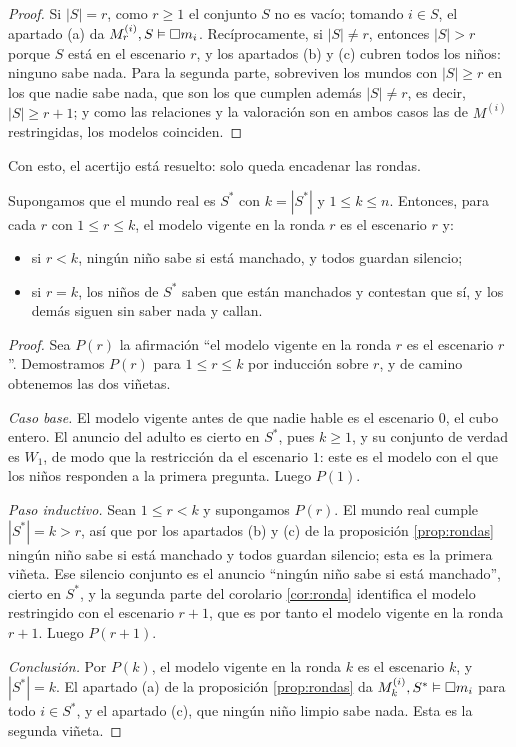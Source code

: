 \begin{proof}
Si $|S| = r$, como $r \ge 1$ el conjunto $S$ no es vacío; tomando $i \in S$, el apartado (a) da $M_r^{(i)}, S \vDash \square m_i$. Recíprocamente, si $|S| \ne r$, entonces $|S| > r$ porque $S$ está en el escenario $r$, y los apartados (b) y (c) cubren todos los niños: ninguno sabe nada. Para la segunda parte, sobreviven los mundos con $|S| \ge r$ en los que nadie sabe nada, que son los que cumplen además $|S| \ne r$, es decir, $|S| \ge r+1$; y como las relaciones y la valoración son en ambos casos las de $M^{(i)}$ restringidas, los modelos coinciden.
\end{proof}

Con esto, el acertijo está resuelto: solo queda encadenar las rondas.

\begin{teorema}\label{teo:muddy}
Supongamos que el mundo real es $S^{*}$ con $k = |S^{*}|$ y $1 \le k \le n$. Entonces, para cada $r$ con $1 \le r \le k$, el modelo vigente en la ronda $r$ es el escenario $r$ y:
\begin{itemize}
  \item si $r < k$, ningún niño sabe si está manchado, y todos guardan silencio;
  \item si $r = k$, los niños de $S^{*}$ saben que están manchados y contestan que sí, y los demás siguen sin saber nada y callan.
\end{itemize}
\end{teorema}

\begin{proof}
Sea $P(r)$ la afirmación ``el modelo vigente en la ronda $r$ es el escenario $r$''. Demostramos $P(r)$ para $1 \le r \le k$ por inducción sobre $r$, y de camino obtenemos las dos viñetas.

\emph{Caso base.} El modelo vigente antes de que nadie hable es el escenario $0$, el cubo entero. El anuncio del adulto es cierto en $S^{*}$, pues $k \ge 1$, y su conjunto de verdad es $W_1$, de modo que la restricción da el escenario $1$: este es el modelo con el que los niños responden a la primera pregunta. Luego $P(1)$.

\emph{Paso inductivo.} Sean $1 \le r < k$ y supongamos $P(r)$. El mundo real cumple $|S^{*}| = k > r$, así que por los apartados (b) y (c) de la proposición \ref{prop:rondas} ningún niño sabe si está manchado y todos guardan silencio; esta es la primera viñeta. Ese silencio conjunto es el anuncio ``ningún niño sabe si está manchado'', cierto en $S^{*}$, y la segunda parte del corolario \ref{cor:ronda} identifica el modelo restringido con el escenario $r+1$, que es por tanto el modelo vigente en la ronda $r+1$. Luego $P(r+1)$.

\emph{Conclusión.} Por $P(k)$, el modelo vigente en la ronda $k$ es el escenario $k$, y $|S^{*}| = k$. El apartado (a) de la proposición \ref{prop:rondas} da $M_k^{(i)}, S^{*} \vDash \square m_i$ para todo $i \in S^{*}$, y el apartado (c), que ningún niño limpio sabe nada. Esta es la segunda viñeta.
\end{proof}

